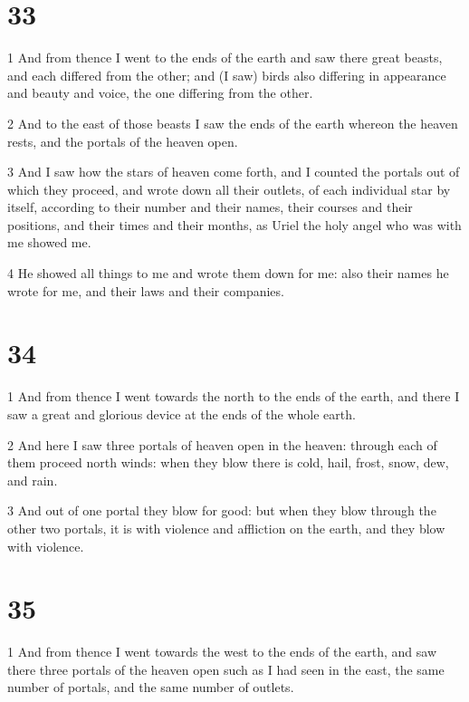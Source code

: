\chapter{33}

\par 1 And from thence I went to the ends of the earth and saw there great beasts, and each differed from the other; and (I saw) birds also differing in appearance and beauty and voice, the one differing from the other.
\par 2 And to the east of those beasts I saw the ends of the earth whereon the heaven rests, and the portals of the heaven open.
\par 3 And I saw how the stars of heaven come forth, and I counted the portals out of which they proceed, and wrote down all their outlets, of each individual star by itself, according to their number and their names, their courses and their positions, and their times and their months, as Uriel the holy angel who was with me showed me.
\par 4 He showed all things to me and wrote them down for me: also their names he wrote for me, and their laws and their companies.

\chapter{34}

\par 1 And from thence I went towards the north to the ends of the earth, and there I saw a great and glorious device at the ends of the whole earth.
\par 2 And here I saw three portals of heaven open in the heaven: through each of them proceed north winds: when they blow there is cold, hail, frost, snow, dew, and rain.
\par 3 And out of one portal they blow for good: but when they blow through the other two portals, it is with violence and affliction on the earth, and they blow with violence.

\chapter{35}

\par 1 And from thence I went towards the west to the ends of the earth, and saw there three portals of the heaven open such as I had seen in the east, the same number of portals, and the same number of outlets.

